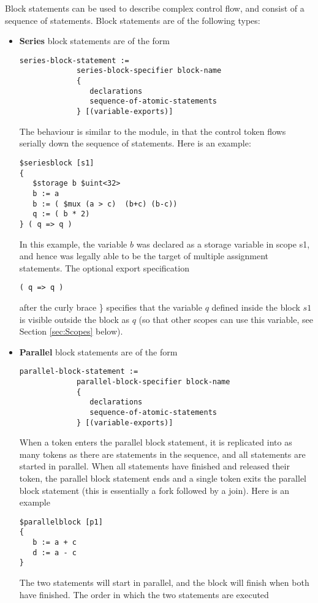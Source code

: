\documentclass{article}
\begin{document}
Block statements can be used to describe complex
control flow,  and consist of a sequence of statements.
Block statements are of
the following types:
\begin{itemize}
\item {\bf Series} block statements are of the form
\begin{verbatim}
series-block-statement :=
             series-block-specifier block-name
             { 
                declarations
                sequence-of-atomic-statements
             } [(variable-exports)]
\end{verbatim}
The behaviour is similar to the module, in that the control
token flows serially down the sequence of statements.
Here is an example:
\begin{verbatim}
$seriesblock [s1] 
{
   $storage b $uint<32>
   b := a
   b := ( $mux (a > c)  (b+c) (b-c))
   q := ( b * 2)
} ( q => q )
\end{verbatim}
In this example, the variable $b$ was declared as
a storage variable in scope s1, and hence was legally
able to be the target of multiple assignment statements.
The optional export specification
\begin{verbatim}
( q => q )
\end{verbatim}
after the curly brace \} specifies that the variable
$q$ defined inside the block $s1$ is visible outside
the block as $q$ (so that other scopes can use this
variable, see Section \ref{sec:Scopes} below).
\item {\bf Parallel} block statements are of the form
\begin{verbatim}
parallel-block-statement :=
             parallel-block-specifier block-name
             { 
                declarations
                sequence-of-atomic-statements
             } [(variable-exports)]
\end{verbatim}
When a token enters the parallel block statement, it
is replicated into as many tokens as there are statements in
the sequence, and all statements are started in parallel.
When all statements have finished and released their token,
the parallel block statement
ends and a single token exits the parallel block statement (this
is essentially a fork followed by a join).
Here is an example
\begin{verbatim}
$parallelblock [p1] 
{
   b := a + c
   d := a - c
}
\end{verbatim} %
The two statements will start in parallel, and the block 
will finish when both have finished.  The
order in which the two statements are executed

\end{itemize}
\end{document}
